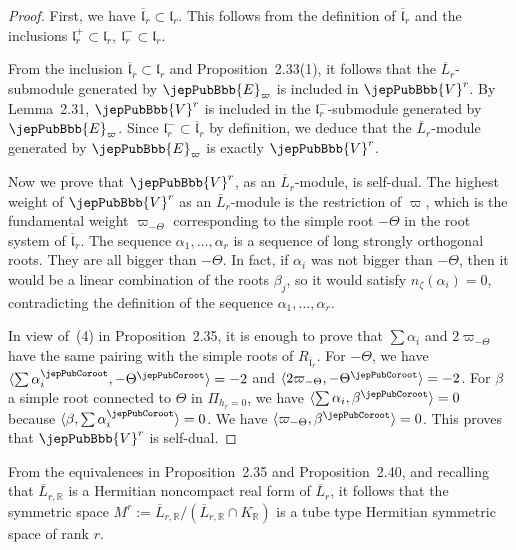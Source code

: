 \begin{proof}
First, we have $\overline{\mathfrak l}_r\subset\mathfrak l_r$. This follows from the definition of $\overline{\mathfrak l}_r$ and the inclusions $\mathfrak l_r^+\subset\mathfrak l_r,\ \mathfrak l_r^-\subset\mathfrak l_r$.

From the inclusion $\overline{\mathfrak l}_r\subset\mathfrak l_r$ and Proposition~2.33(1), it follows that the $\overline L_r$-submodule generated by $\jepPubBbb{E}_\varpi$ is included in $\jepPubBbb{V}^r$. By Lemma~2.31, $\jepPubBbb{V}^r$ is included in the $\mathfrak l_r^-$-submodule generated by $\jepPubBbb{E}_\varpi$. Since $\mathfrak l_r^-\subset\overline{\mathfrak l}_r$ by definition, we deduce that the $\overline L_r$-module generated by $\jepPubBbb{E}_\varpi$ is exactly $\jepPubBbb{V}^r$.

Now we prove that $\jepPubBbb{V}^r$, as an $\overline L_r$-module, is self-dual. The highest weight of $\jepPubBbb{V}^r$ as an $\overline L_r$-module is the restriction of $\varpi$, which is the fundamental weight $\varpi_{-\Theta}$ corresponding to the simple root $-\Theta$ in the root system of $\overline{\mathfrak l}_r$. The sequence $\alpha_1,\ldots,\alpha_r$ is a sequence of long strongly orthogonal roots. They are all bigger than $-\Theta$. In fact, if $\alpha_i$ was not bigger than $-\Theta$, then it would be a linear combination of the roots $\beta_j$, so it would satisfy $n_\zeta(\alpha_i)=0$, contradicting the definition of the sequence $\alpha_1,\ldots,\alpha_r$.

In view of~(4) in Proposition~2.35, it is enough to prove that $\sum\alpha_i$ and $2\varpi_{-\Theta}$ have the same pairing with the simple roots of $R_{\overline{\mathfrak l}_r}$. For $-\Theta$, we have $\langle\sum\alpha_i^\jepPubCoroot,-\Theta^\jepPubCoroot\rangle=-2$ and $\langle2\varpi_{-\Theta},-\Theta^\jepPubCoroot\rangle=-2$. For $\beta$ a simple root connected to $\Theta$ in $\Pi_{h_r=0}$, we have $\langle\sum\alpha_i,\beta^\jepPubCoroot\rangle=0$ because $\langle\beta,\sum\alpha_i^\jepPubCoroot\rangle=0$. We have $\langle\varpi_{-\Theta},\beta^\jepPubCoroot\rangle=0$. This proves that $\jepPubBbb{V}^r$ is self-dual.
\end{proof}
From the equivalences in Proposition~2.35 and Proposition~2.40, and recalling that $\overline L_{r,\mathbb R}$ is a Hermitian noncompact real form of $\overline L_r$, it follows that the symmetric space $M^r:=\overline L_{r,\mathbb R}/(\overline L_{r,\mathbb R}\cap K_{\mathbb R})$ is a tube type Hermitian symmetric space of rank $r$.
